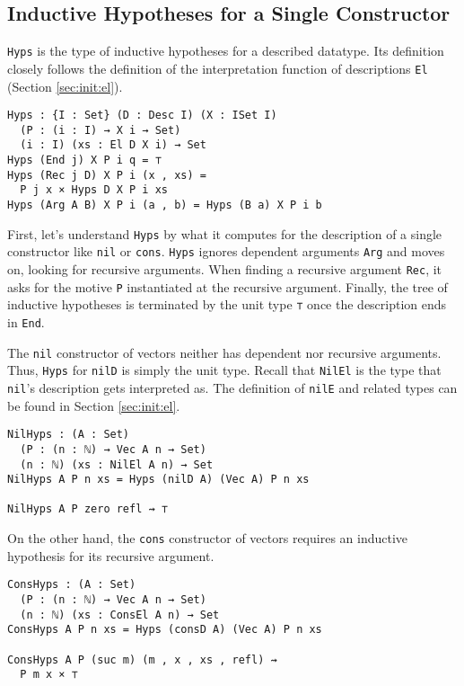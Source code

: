 \documentclass[preprint,nonatbib]{sigplanconf}
\newcommand{\refsec}[1]{Section \ref{sec:#1}}
\begin{document}
\subsection{Inductive Hypotheses for a Single Constructor}

{\tt Hyps} is the type of inductive hypotheses for a described
datatype. Its definition closely follows the definition of
the interpretation function of descriptions {\tt El}
(\refsec{init:el}).

\begin{verbatim}
Hyps : {I : Set} (D : Desc I) (X : ISet I)
  (P : (i : I) → X i → Set)
  (i : I) (xs : El D X i) → Set
Hyps (End j) X P i q = ⊤
Hyps (Rec j D) X P i (x , xs) =
  P j x × Hyps D X P i xs
Hyps (Arg A B) X P i (a , b) = Hyps (B a) X P i b
\end{verbatim}

First, let's understand {\tt Hyps} by what it computes for the
description of a single constructor like {\tt nil} or {\tt cons}.
{\tt Hyps} ignores dependent arguments {\tt Arg} and moves on, looking
for recursive arguments. When finding a recursive argument {\tt Rec}, it
asks for the motive {\tt P} instantiated at the recursive argument.
Finally, the tree of inductive hypotheses is terminated by the unit
type {\tt ⊤} once the description ends in {\tt End}.

The {\tt nil} constructor of vectors neither has dependent nor
recursive arguments. Thus, {\tt Hyps} for {\tt nilD} is simply
the unit type. Recall that {\tt NilEl} is the type that
{\tt nil}'s description gets interpreted as. The definition of
{\tt nilE} and related types can be found in \refsec{init:el}.

\begin{verbatim}
NilHyps : (A : Set)
  (P : (n : ℕ) → Vec A n → Set)
  (n : ℕ) (xs : NilEl A n) → Set
NilHyps A P n xs = Hyps (nilD A) (Vec A) P n xs

NilHyps A P zero refl ⇝ ⊤
\end{verbatim}

On the other hand, the {\tt cons} constructor of vectors requires an
inductive hypothesis for its recursive argument.

\begin{verbatim}
ConsHyps : (A : Set)
  (P : (n : ℕ) → Vec A n → Set)
  (n : ℕ) (xs : ConsEl A n) → Set
ConsHyps A P n xs = Hyps (consD A) (Vec A) P n xs

ConsHyps A P (suc m) (m , x , xs , refl) ⇝
  P m x × ⊤
\end{verbatim}
\end{document}
